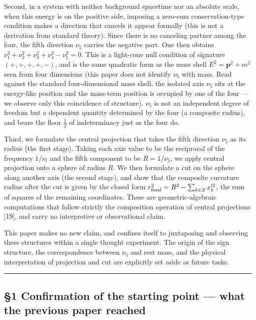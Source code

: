 \documentclass[
]{article}
\begin{document}
Second, in a system with neither background spacetime nor an absolute
scale, when this energy is on the positive side, imposing a zero-sum
conservation-type condition makes a direction that cancels it appear
formally (this is not a derivation from standard theory). Since there is
no canceling partner among the four, the fifth direction \(\nu_5\)
carries the negative part. One then obtains
\(\nu_1^2+\nu_2^2+\nu_3^2+\nu_4^2-\nu_5^2=0\). This is a light-cone null
condition of signature \((+,+,+,+,-)\), and is the same quadratic form
as the mass shell \(E^2=\boldsymbol{p}^2+m^2\) seen from four dimensions
(this paper does not identify \(\nu_5\) with mass. Read against the
standard four-dimensional mass shell, the isolated axis \(\nu_5\) sits
at the energy-like position and the mass-term position is occupied by
one of the four --- we observe only this coincidence of structure).
\(\nu_5\) is not an independent degree of freedom but a dependent
quantity determined by the four (a composite radius), and bears the
floor \(\tfrac12\) of indeterminacy just as the four do.

Third, we formulate the central projection that takes the fifth
direction \(\nu_5\) as its radius (the first stage). Taking each axis
value to be the reciprocal of the frequency \(1/\nu_i\) and the fifth
component to be \(R=1/\nu_5\), we apply central projection onto a sphere
of radius \(R\). We then formulate a cut on the sphere along another
axis (the second stage), and show that the composite curvature radius
after the cut is given by the closed form
\(r_{\rm final}^2=R^2-\sum_{k\in S}x_k'^2\), the sum of squares of the
remaining coordinates. These are geometric-algebraic computations that
follow strictly the composition operation of central projections
{[}19{]}, and carry no interpretive or observational claim.

This paper makes no new claim, and confines itself to juxtaposing and
observing these structures within a single thought experiment. The
origin of the sign structure, the correspondence between \(\nu_5\) and
rest mass, and the physical interpretation of projection and cut are
explicitly set aside as future tasks.

\begin{center}\rule{0.5\linewidth}{0.5pt}\end{center}

\subsection{§1 Confirmation of the starting point --- what the previous
paper
reached}\label{confirmation-of-the-starting-point-what-the-previous-paper-reached}
\end{document}
